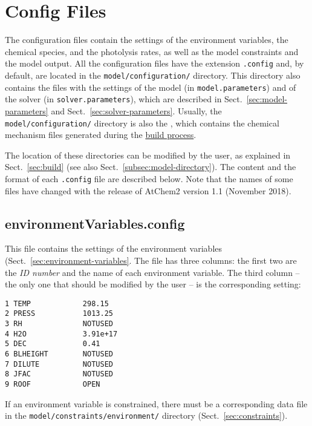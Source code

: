\section{Config Files} \label{sec:config-files}

The configuration files contain the settings of the environment
variables, the chemical species, and the photolysis rates, as well as
the model constraints and the model output. All the configuration
files have the extension \texttt{.config} and, by default, are located
in the \texttt{model/configuration/} directory. This directory also
contains the files with the settings of the model (in
\texttt{model.parameters}) and of the solver (in
\texttt{solver.parameters}), which are described in
Sect.~\ref{sec:model-parameters} and Sect.~\ref{sec:solver-parameters}.
Usually, the \texttt{model/configuration/} directory is also the
\sharedir, which contains the chemical mechanism files generated
during the \hyperref[subsec:build-process]{build process}.

The location of these directories can be modified by the user, as
explained in Sect.~\ref{sec:build} (see also
Sect.~\ref{subsec:model-directory}).  
The content and the format of each \texttt{.config} file are described
below. Note that the names of some files have changed with the release
of AtChem2 version 1.1 (November 2018).

\subsection{environmentVariables.config} \label{subsec:environmentvariables}

This file contains the settings of the environment variables
(Sect.~\ref{sec:environment-variables}. The file has three columns:
the first two are the \emph{ID number} and the name of each
environment variable. The third column -- the only one that should be
modified by the user -- is the corresponding setting:

\begin{verbatim}
1 TEMP            298.15
2 PRESS           1013.25
3 RH              NOTUSED
4 H2O             3.91e+17
5 DEC             0.41
6 BLHEIGHT        NOTUSED
7 DILUTE          NOTUSED
8 JFAC            NOTUSED
9 ROOF            OPEN
\end{verbatim}

If an environment variable is constrained, there must be a
corresponding data file in the \texttt{model/constraints/environment/}
directory (Sect.~\ref{sec:constraints}).

